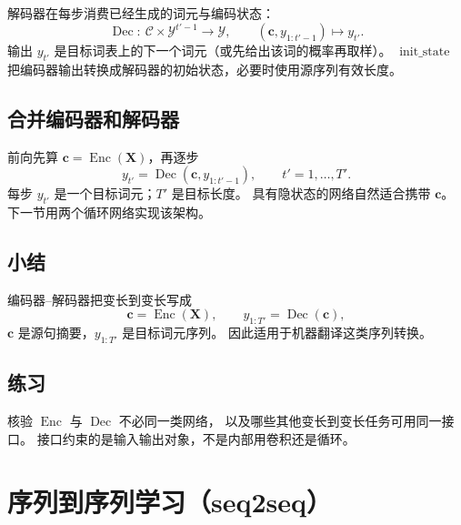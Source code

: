 解码器在每步消费已经生成的词元与编码状态：
\[
\operatorname{Dec}:\ \mathcal{C}\times\mathcal{Y}^{t'-1}\to\mathcal{Y},
\qquad
(\bm{c},y_{1:t'-1})\mapsto y_{t'}.
\]
输出 $y_{t'}$ 是目标词表上的下一个词元（或先给出该词的概率再取样）。
$\operatorname{init\_state}$ 把编码器输出转换成解码器的初始状态，必要时使用源序列有效长度。

\subsection{合并编码器和解码器}

前向先算 $\bm{c}=\operatorname{Enc}(\bm{X})$，再逐步
\[
y_{t'}=\operatorname{Dec}(\bm{c},y_{1:t'-1}),
\qquad t'=1,\ldots,T'.
\]
每步 $y_{t'}$ 是一个目标词元；$T'$ 是目标长度。
具有隐状态的网络自然适合携带 $\bm{c}$。下一节用两个循环网络实现该架构。

\subsection{小结}

编码器--解码器把变长到变长写成
\[
\bm{c}=\operatorname{Enc}(\bm{X}),
\qquad
y_{1:T'}=\operatorname{Dec}(\bm{c}),
\]
$\bm{c}$ 是源句摘要，$y_{1:T'}$ 是目标词元序列。
因此适用于机器翻译这类序列转换。

\subsection{练习}

核验 $\operatorname{Enc}$ 与 $\operatorname{Dec}$ 不必同一类网络，
以及哪些其他变长到变长任务可用同一接口。
接口约束的是输入输出对象，不是内部用卷积还是循环。

\section{序列到序列学习（seq2seq）}





